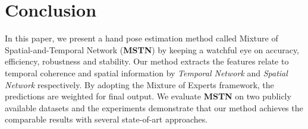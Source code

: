 \documentclass[journal,comsoc]{IEEEtran}
\begin{document}
\section{Conclusion}\label{sec:conclusion}
In this paper, we present a hand pose estimation method called Mixture of Spatial-and-Temporal Network (\textbf{MSTN})
by keeping a watchful eye on accuracy, efficiency, robustness and stability. Our method extracts the features relate to
temporal coherence and spatial information by \emph{Temporal Network} and \emph{Spatial Network} respectively. By adopting
the Mixture of Experts framework, the predictions are weighted for final output. We evaluate \textbf{MSTN} on two publicly
available datasets and the experiments demonstrate that our method achieves the comparable results with several state-of-art
approaches.

\appendices





\ifCLASSOPTIONcaptionsoff
  \newpage
\fi




\end{document}
